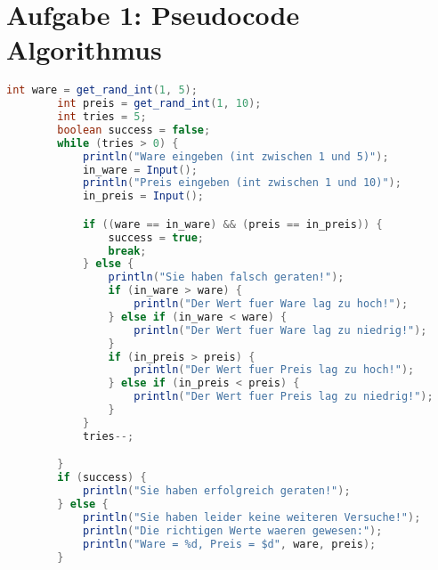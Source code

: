 \documentclass{article}
\begin{document}
    \section*{Aufgabe 1: Pseudocode Algorithmus}
    \begin{lstlisting}[language=java, showspaces=false]
        int ware = get_rand_int(1, 5);
        int preis = get_rand_int(1, 10);
        int tries = 5;
        boolean success = false;
        while (tries > 0) {
            println("Ware eingeben (int zwischen 1 und 5)");
            in_ware = Input();
            println("Preis eingeben (int zwischen 1 und 10)");
            in_preis = Input();

            if ((ware == in_ware) && (preis == in_preis)) {
                success = true;
                break;
            } else {
                println("Sie haben falsch geraten!");
                if (in_ware > ware) {
                    println("Der Wert fuer Ware lag zu hoch!");
                } else if (in_ware < ware) {
                    println("Der Wert fuer Ware lag zu niedrig!");
                }
                if (in_preis > preis) {
                    println("Der Wert fuer Preis lag zu hoch!");
                } else if (in_preis < preis) {
                    println("Der Wert fuer Preis lag zu niedrig!");
                }
            }
            tries--;

        }
        if (success) {
            println("Sie haben erfolgreich geraten!");
        } else {
            println("Sie haben leider keine weiteren Versuche!");
            println("Die richtigen Werte waeren gewesen:");
            println("Ware = %d, Preis = $d", ware, preis);
        }


    \end{lstlisting}

    
\end{document}
